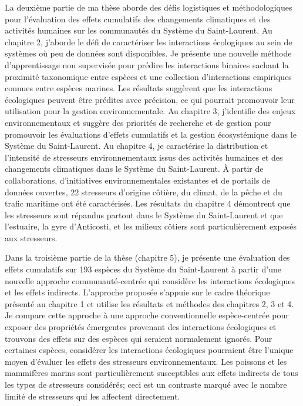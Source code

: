 La deuxième partie de ma thèse aborde des défis logistiques et
méthodologiques pour l'évaluation des effets cumulatifs des changements
climatiques et des activités humaines sur les communautés du Système du
Saint-Laurent. Au chapitre 2, j'aborde le défi de caractériser les
interactions écologiques au sein de systèmes où peu de données sont
disponibles. Je présente une nouvelle méthode d'apprentissage non
supervisée pour prédire les interactions binaires sachant la proximité
taxonomique entre espèces et une collection d'interactions empiriques
connues entre espèces marines. Les résultats suggèrent que les
interactions écologiques peuvent être prédites avec précision, ce qui
pourrait promouvoir leur utilisation pour la gestion environnementale.
Au chapitre 3, j'identifie des enjeux environnementaux et suggère des
priorités de recherche et de gestion pour promouvoir les évaluations
d'effets cumulatifs et la gestion écosystémique dans le Système du
Saint-Laurent. Au chapitre 4, je caractérise la distribution et
l'intensité de stresseurs environnementaux issus des activités humaines
et des changements climatiques dans le Système du Saint-Laurent. À
partir de collaborations, d'initiatives environnementales existantes et
de portails de données ouvertes, 22 stresseurs d'origine côtière, du
climat, de la pêche et du trafic maritime ont été caractérisés. Les
résultats du chapitre 4 démontrent que les stresseurs sont répandus
partout dans le Système du Saint-Laurent et que l'estuaire, la gyre
d'Anticosti, et les milieux côtiers sont particulièrement exposés aux
stresseurs.

Dans la troisième partie de la thèse (chapitre 5), je présente une
évaluation des effets cumulatifs sur 193 espèces du Système du
Saint-Laurent à partir d'une nouvelle approche communauté-centrée qui
considère les interactions écologiques et les effets indirects.
L'approche proposée s'appuie sur le cadre théorique présenté au chapitre
1 et utilise les résultats et méthodes des chapitres 2, 3 et 4. Je
compare cette approche à une approche conventionnelle espèce-centrée
pour exposer des propriétés émergentes provenant des interactions
écologiques et trouvons des effets sur des espèces qui seraient
normalement ignorés. Pour certaines espèces, considérer les interactions
écologiques pourraient être l'unique moyen d'évaluer les effets des
stresseurs environnementaux. Les poissons et les mammifères marins sont
particulièrement susceptibles aux effets indirects de tous les types de
stresseurs considérés; ceci est un contraste marqué avec le nombre
limité de stresseurs qui les affectent directement.

